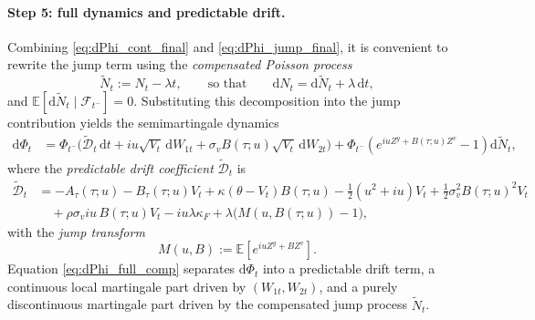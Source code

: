 \documentclass[a4paper,titlepage,12pt]{report}
\theoremstyle{plain}
\begin{document}
\paragraph{Step 5: full dynamics and predictable drift.}
Combining \eqref{eq:dPhi_cont_final} and \eqref{eq:dPhi_jump_final}, it is convenient to rewrite the
jump term using the \emph{compensated Poisson process}
\[
\widetilde{N}_t := N_t-\lambda t,
\qquad\text{so that}\qquad
\mathrm{d}N_t = \mathrm{d}\widetilde{N}_t + \lambda\,\mathrm{d}t,
\]
and $\mathbb{E}[\mathrm{d}\widetilde{N}_t\mid\mathcal{F}_{t^-}]=0$. Substituting this decomposition
into the jump contribution yields the semimartingale dynamics
\begin{align}
\mathrm{d}\Phi_t
&=
\Phi_{t^-}\Big(
\widetilde{\mathcal{D}}_t\,\mathrm{d}t
+
iu\sqrt{V_t}\,\mathrm{d}W_{1t}
+
\sigma_v B(\tau;u)\sqrt{V_t}\,\mathrm{d}W_{2t}
\Big)
+
\Phi_{t^-}\left(e^{iuZ^y+B(\tau;u)Z^v}-1\right)\mathrm{d}\widetilde{N}_t,
\label{eq:dPhi_full_comp}
\end{align}
where the \emph{predictable drift coefficient} $\widetilde{\mathcal{D}}_t$ is
\begin{align}
\widetilde{\mathcal{D}}_t
&=
-A_\tau(\tau;u)-B_\tau(\tau;u)V_t
+\kappa(\theta-V_t)B(\tau;u)
-\frac12(u^2+iu)V_t
+\frac12\sigma_v^2 B(\tau;u)^2V_t
\nonumber\\
&\quad
+\rho\sigma_v iu\,B(\tau;u)V_t
-iu\lambda\kappa_F
+\lambda\Big(M(u,B(\tau;u))-1\Big),
\label{eq:drift_with_A_B_derivs_comp}
\end{align}
with the \emph{jump transform}
\begin{equation}
M(u,B):=\mathbb{E}\!\left[e^{iuZ^y+BZ^v}\right].
\label{eq:jump_transform_def}
\end{equation}
Equation \eqref{eq:dPhi_full_comp} separates $\mathrm{d}\Phi_t$ into a predictable drift term, a
continuous local martingale part driven by $(W_{1t},W_{2t})$, and a purely discontinuous martingale
part driven by the compensated jump process $\widetilde{N}_t$.
\end{document}
